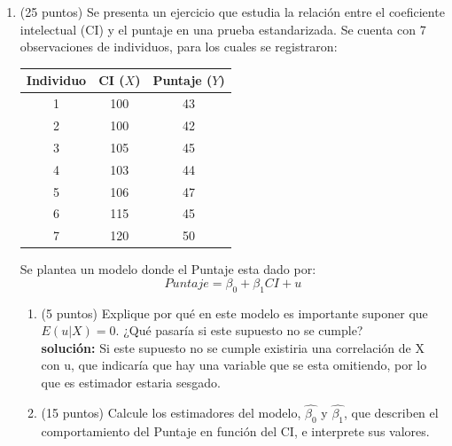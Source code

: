 \documentclass[10pt,a4paper]{article}
\begin{document}
\begin{enumerate}
\begin{enumerate}
    \item (10 puntos) Denuestre que la varianza del estimador $\beta_1$ aumenta.
    \\
    \textbf{Solución}: Se puede ver que $\nu = \varepsilon + u$, por lo que su varianza esta dada por:
    $$Var(\nu)=Var(\varepsilon) + Var(u)=\sigma^2 + 1$$
    Por lo que la varianza del estimador queda dada por
    $$Var(\beta^*_1\mid X) = \frac{Var(\nu)}{\sum (X-\Bar{X})^2}=\frac{\sigma^2+1}{\sum (X-\Bar{X})^2}> \frac{\sigma^2}{\sum (X-\Bar{X})^2}=\frac{Var(\varepsilon)}{\sum (X-\Bar{X})^2}=Var(\beta_1\mid X)$$

\end{enumerate}




\item (25 puntos) Se presenta un ejercicio que estudia la relación entre el coeficiente intelectual (CI) y el puntaje en una prueba estandarizada. Se cuenta con 7 observaciones de individuos, para los cuales se registraron:

\begin{center}
\begin{tabular}{|c|c|c|}
\hline
\textbf{Individuo} & \textbf{CI} ($X$) & \textbf{Puntaje} ($Y$)\\
\hline
1 & 100  & 43 \\
2 & 100 & 42 \\
3 & 105 & 45 \\
4 & 103 & 44 \\
5 & 106 & 47 \\
6 & 115 & 45 \\
7 & 120 & 50 \\
\hline
\end{tabular}
\end{center}

Se plantea un modelo donde el Puntaje esta dado por:
$$Puntaje = \beta_0 + \beta_1 CI + u$$

\begin{enumerate}
    \item (5 puntos) Explique por qué en este modelo es importante suponer que $E(u|X)=0$. ¿Qué pasaría si este supuesto no se cumple?
    \\
    \textbf{solución:}
    Si este supuesto no se cumple existiria una correlación de X con u, que indicaría que hay una variable que se esta omitiendo, por lo que es estimador estaria sesgado.

    \item (15 puntos) Calcule los estimadores del modelo, $\hat{\beta_0}$ y $\hat{\beta_1}$, que describen el comportamiento del Puntaje en función del CI, e interprete sus valores.


\end{enumerate}
\end{enumerate}
\end{document}
